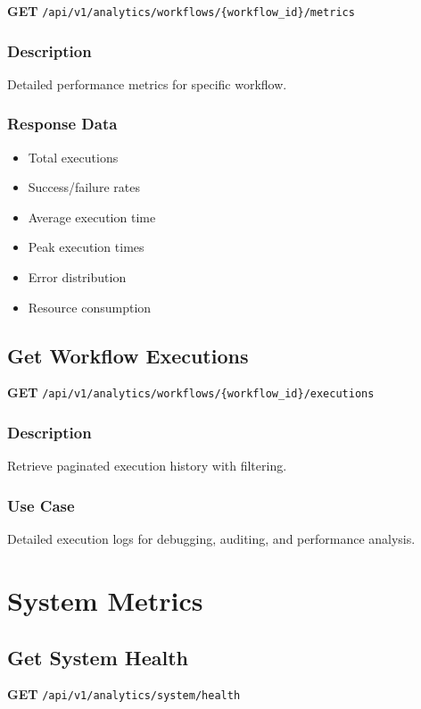 \documentclass[11pt,a4paper]{report}
\begin{document}
\textbf{GET} \texttt{/api/v1/analytics/workflows/\{workflow\_id\}/metrics}

\subsubsection{Description}
Detailed performance metrics for specific workflow.

\subsubsection{Response Data}
\begin{itemize}[leftmargin=*]
    \item Total executions
    \item Success/failure rates
    \item Average execution time
    \item Peak execution times
    \item Error distribution
    \item Resource consumption
\end{itemize}

\subsection{Get Workflow Executions}

\textbf{GET} \texttt{/api/v1/analytics/workflows/\{workflow\_id\}/executions}

\subsubsection{Description}
Retrieve paginated execution history with filtering.

\subsubsection{Use Case}
Detailed execution logs for debugging, auditing, and performance analysis.

\section{System Metrics}

\subsection{Get System Health}

\textbf{GET} \texttt{/api/v1/analytics/system/health}
\end{document}
